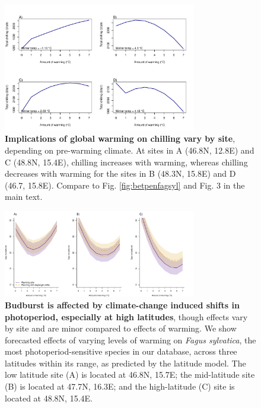 \documentclass{article}
\begin{document}
\begin{figure}[h!]
\centering
\noindent \includegraphics[width=0.75\textwidth]{..//..//analyses/bb_analysis/figures/forecasting/chillforecastbothspp_1_7_degwarm.pdf}
\caption{\textbf{Implications of global warming on chilling vary by site}, depending on pre-warming climate. At sites in A (46.8\degree N, 12.8\degree E) and C (48.8\degree N, 15.4\degree E), chilling increases with warming, whereas chilling decreases with warming for the sites in B (48.3\degree N, 15.8\degree E) and D (46.7, 15.8\degree E). Compare to Fig. \ref{fig:betpenfagsyl} and Fig. 3 in the main text.}
\label{fig:chillfore}
\end{figure}

\begin{figure}[h!]
\centering
\noindent \includegraphics[width=0.75\textwidth]{..//..//analyses/bb_analysis/figures/forecasting/fagsyl_3lats.pdf}
\caption{\textbf{Budburst is affected by climate-change induced shifts in photoperiod, especially at high latitudes}, though effects vary by site and are minor compared to effects of warming. We show forecasted effects of varying levels of warming on \emph{Fagus sylvatica}, the most photoperiod-sensitive species in our database, across three latitudes within its range, as predicted by the latitude model. The low latitude site (A) is  located at 46.8\degree N, 15.7\degree E; the mid-latitude site (B) is located at 47.7\degree N, 16.3\degree E; and the high-latitude (C) site is located at 48.8\degree N, 15.4\degree E.}
\label{fig:fagsyllat}
\end{figure}
\end{document}
